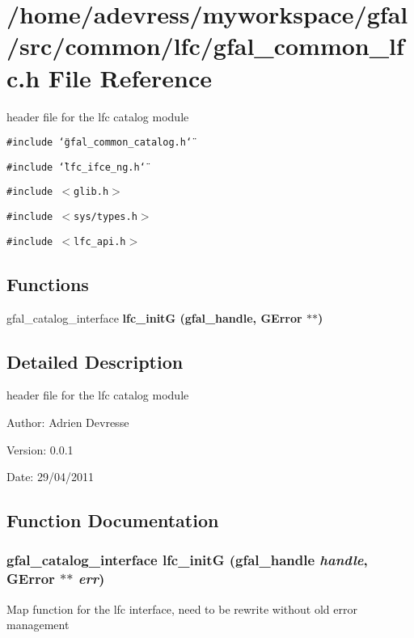\section{/home/adevress/myworkspace/gfal/src/common/lfc/gfal\_\-common\_\-lfc.h File Reference}
\label{gfal__common__lfc_8h}
header file for the lfc catalog module 

{\tt \#include \char`\"{}gfal\_\-common\_\-catalog.h\char`\"{}}\par
{\tt \#include \char`\"{}lfc\_\-ifce\_\-ng.h\char`\"{}}\par
{\tt \#include $<$glib.h$>$}\par
{\tt \#include $<$sys/types.h$>$}\par
{\tt \#include $<$lfc\_\-api.h$>$}\par
\subsection*{Functions}
\begin{CompactItemize}
\item 
gfal\_\-catalog\_\-interface \bf{lfc\_\-init\-G} (gfal\_\-handle, GError $\ast$$\ast$)
\end{CompactItemize}


\subsection{Detailed Description}
header file for the lfc catalog module 

\begin{Desc}
\item[Author:]Adrien Devresse \end{Desc}
\begin{Desc}
\item[Version:]0.0.1 \end{Desc}
\begin{Desc}
\item[Date:]29/04/2011 \end{Desc}


\subsection{Function Documentation}
\subsubsection{\setlength{\rightskip}{0pt plus 5cm}gfal\_\-catalog\_\-interface lfc\_\-init\-G (gfal\_\-handle {\em handle}, GError $\ast$$\ast$ {\em err})}\label{gfal__common__lfc_8h_0d4af55002fa4216f9915b5a1a721ef4}


Map function for the lfc interface, need to be rewrite without old error management 